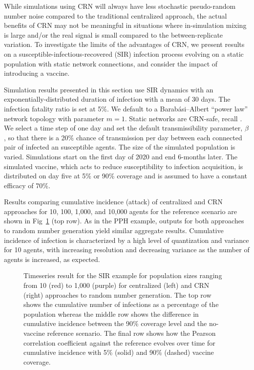 \documentclass[10pt,letterpaper]{article}
\newcommand{\ba}{Barab\'asi--Albert }
\begin{document}
While simulations using CRN will always have less stochastic pseudo-random number noise compared to the traditional centralized approach, the actual benefits of CRN may not be meaningful in situations where in-simulation mixing is large and/or the real signal is small compared to the between-replicate variation. To investigate the limits of the advantages of CRN, we present results on a susceptible-infectious-recovered (SIR) infection process evolving on a static population with static network connections, and consider the impact of introducing a vaccine.

Simulation results presented in this section use SIR dynamics with an exponentially-distributed duration of infection with a mean of 30 days. The infection fatality ratio is set at 5\%. We default to a \ba ``power law'' network topology with parameter $m=1$. Static networks are CRN-safe, recall . We select a time step of one day and set the default transmissibility parameter, $\beta$, so that there is a 20\% chance of transmission per day between each connected pair of infected an susceptible agents. The size of the simulated population is varied. Simulations start on the first day of 2020 and end 6-months later. The simulated vaccine, which acts to reduce susceptibility to infection acquisition, is distributed on day five at 5\% or 90\% coverage and is assumed to have a constant efficacy of 70\%.

Results comparing cumulative incidence (attack) of centralized and CRN approaches for 10, 100, 1,000, and 10,000 agents for the reference scenario are shown in Fig~\ref{f:sir_n} (top row). As in the PPH example, outputs for both approaches to random number generation yield similar aggregate results. Cumulative incidence of infection is characterized by a high level of quantization and variance for 10 agents, with increasing resolution and decreasing variance as the number of agents is increased, as expected.

\begin{figure}[!ht]
\centering
\caption{Timeseries result for the SIR example for population sizes ranging from 10 (red) to 1,000 (purple) for centralized (left) and CRN (right) approaches to random number generation. The top row shows the cumulative number of infections as a percentage of the population whereas the middle row shows the difference in cumulative incidence between the 90\% coverage level and the no-vaccine reference scenario. The final row shows how the Pearson correlation coefficient against the reference evolves over time for cumulative incidence with 5\% (solid) and 90\% (dashed) vaccine coverage.}
\label{f:sir_n}
\end{figure}
\end{document}
